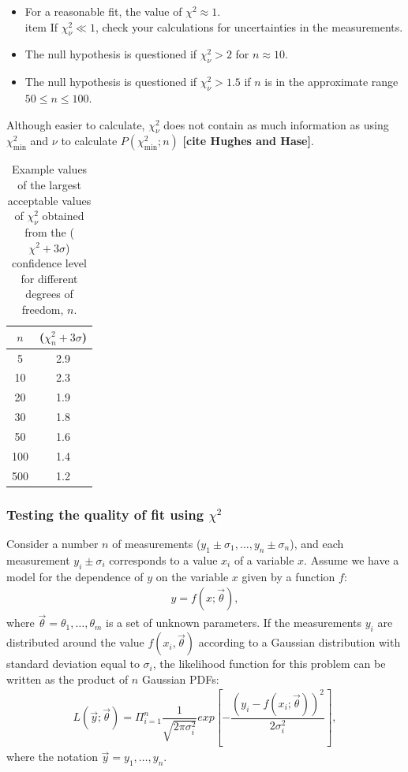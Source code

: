 \begin{itemize}
	\item For a reasonable fit, the value of $\chi^2\approx1$.
	\\item If $\chi^2_\nu \ll 1$, check your calculations for uncertainties in the measurements.
	\item The null hypothesis is questioned if $\chi^2_\nu > 2$ for $n\approx10$.
	\item The null hypothesis is questioned if $\chi^2_\nu > 1.5$ if $n$ is in the approximate range $50\leq n \leq 100$.
\end{itemize}

Although easier to calculate, $\chi^2_\nu$ does not contain as much information as using $\chi^2_\mathrm{min}$ and $\nu$ to calculate $P(\chi^2_\mathrm{min};n)$ \textbf{[cite Hughes and Hase]}. 

\begin{table}
	\centering
	\begin{tabular}{cc}
		\toprule
		$n$ & ($\chi^2_n + 3\sigma$)\\
		\midrule
		5 & 2.9 \\
		10 & 2.3 \\
		20 & 1.9 \\
		30 & 1.8 \\
		50 & 1.6 \\				
		100 & 1.4 \\
		500 & 1.2 \\				
		\bottomrule
	\end{tabular}	
	\caption{Example values of the largest acceptable values of $\chi^2_\nu$ obtained from the ($\chi^2 + 3\sigma$) confidence level for different degrees of freedom, $n$.}
	\label{tab:reduced-chi-squared-3sigma}
\end{table}

\subsubsection{Testing the quality of fit using $\chi^2$}
Consider a number $n$ of measurements ($y_1 \pm \sigma_1, \dots, y_n\pm\sigma_n$), and each measurement $y_i\pm\sigma_i$ corresponds to a value $x_i$ of a variable $x$. Assume we have a model for the dependence of $y$ on the variable $x$ given by a function $f$:
\begin{align}
	y=f(x;\vec{\theta}),
\end{align}
where $\vec{\theta}={\theta_1, \dots, \theta_m}$ is a set of unknown parameters. If the measurements $y_i$ are distributed around the value $f(x_i, \vec{\theta})$ according to a Gaussian distribution with standard deviation equal to $\sigma_i$, the likelihood function for this problem can be written as the product of $n$ Gaussian PDFs:
\begin{align}
	L(\vec{y};\vec{\theta})=\Pi_{i=1}^n \dfrac{1}{\sqrt{2\pi\sigma_i^2}} exp\left[- \dfrac{(y_i-f(x_i;\vec{\theta}))^2}{2\sigma_i^2}\right],
\end{align}
where the notation $\vec{y}={y_1, \dots, y_n}$.

